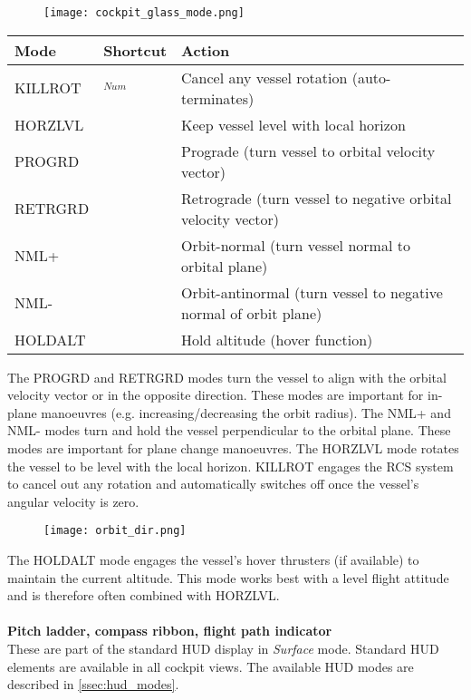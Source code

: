\documentclass[Orbiter User Manual.tex]{subfiles}
\begin{document}
\begin{figure}[H]
  \centering
  \texttt{[image: cockpit\_glass\_mode.png]}
\end{figure}

	\begin{longtable}{ |p{}|p{}|p{}| }
	\hline\rule{0pt}{2ex}
	\textbf{Mode} & \textbf{Shortcut} & \textbf{Action}\\
	\hline\rule{0pt}{2ex}
	KILLROT & \keystroke{5}$_{Num}$ & Cancel any vessel rotation (auto-terminates)\\
	\hline\rule{0pt}{2ex}
	HORZLVL & \keystroke{L} & Keep vessel level with local horizon\\
	\hline\rule{0pt}{2ex}
	PROGRD & \keystroke{[} & Prograde (turn vessel to orbital velocity vector)\\
	\hline\rule{0pt}{2ex}
	RETRGRD & \keystroke{]} & Retrograde (turn vessel to negative orbital velocity vector)\\
	\hline\rule{0pt}{2ex}
	NML+ & \keystroke{;} & Orbit-normal (turn vessel normal to orbital plane)\\
	\hline\rule{0pt}{2ex}
	NML- & \keystroke{'} & Orbit-antinormal (turn vessel to negative normal of orbit plane)\\
	\hline\rule{0pt}{2ex}
	HOLDALT & \keystroke{A} & Hold altitude (hover function)\\
	\hline
	\end{longtable}

\noindent
The PROGRD and RETRGRD modes turn the vessel to align with the orbital velocity vector or in the opposite direction. These modes are important for in-plane manoeuvres (e.g. increasing/decreasing the orbit radius). The NML+ and NML- modes turn and hold the vessel perpendicular to the orbital plane. These modes are important for plane change manoeuvres. The HORZLVL mode rotates the vessel to be level with the local horizon. KILLROT engages the RCS system to cancel out any rotation and automatically switches off once the vessel's angular velocity is zero.

\begin{figure}[H]
  \centering
  \texttt{[image: orbit\_dir.png]}
\end{figure}

\noindent
The HOLDALT mode engages the vessel's hover thrusters (if available) to maintain the current altitude. This mode works best with a level flight attitude and is therefore often combined with HORZLVL.\\
\\
\textbf{Pitch ladder, compass ribbon, flight path indicator}\\
These are part of the standard HUD display in \textit{Surface} mode. Standard HUD elements are available in all cockpit views. The available HUD modes are described in \ref{ssec:hud_modes}.
\end{document}
